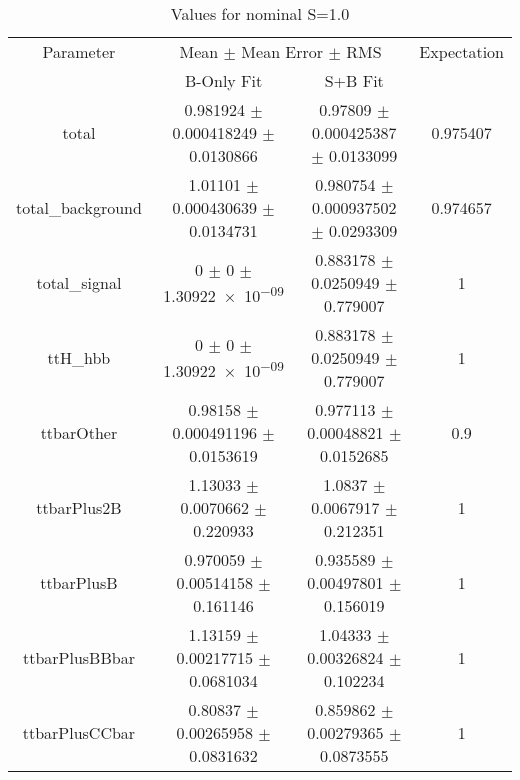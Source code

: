 \begin{table}
\centering
\caption{Values for nominal S=1.0}
\begin{tabular}{cccc}
\toprule
Parameter & \multicolumn{2}{c}{Mean $\pm$ Mean Error $\pm$ RMS} & Expectation\\
 & B-Only Fit & S+B Fit & \\
\midrule
total & \num{0.981924} $\pm$ \num{0.000418249} $\pm$ \num{0.0130866} & \num{0.97809} $\pm$ \num{0.000425387} $\pm$ \num{0.0133099} & \num{0.975407}\\
total\_background & \num{1.01101} $\pm$ \num{0.000430639} $\pm$ \num{0.0134731} & \num{0.980754} $\pm$ \num{0.000937502} $\pm$ \num{0.0293309} & \num{0.974657}\\
total\_signal & \num{0} $\pm$ \num{0} $\pm$ \num{1.30922e-09} & \num{0.883178} $\pm$ \num{0.0250949} $\pm$ \num{0.779007} & \num{1}\\
ttH\_hbb & \num{0} $\pm$ \num{0} $\pm$ \num{1.30922e-09} & \num{0.883178} $\pm$ \num{0.0250949} $\pm$ \num{0.779007} & \num{1}\\
ttbarOther & \num{0.98158} $\pm$ \num{0.000491196} $\pm$ \num{0.0153619} & \num{0.977113} $\pm$ \num{0.00048821} $\pm$ \num{0.0152685} & \num{0.9}\\
ttbarPlus2B & \num{1.13033} $\pm$ \num{0.0070662} $\pm$ \num{0.220933} & \num{1.0837} $\pm$ \num{0.0067917} $\pm$ \num{0.212351} & \num{1}\\
ttbarPlusB & \num{0.970059} $\pm$ \num{0.00514158} $\pm$ \num{0.161146} & \num{0.935589} $\pm$ \num{0.00497801} $\pm$ \num{0.156019} & \num{1}\\
ttbarPlusBBbar & \num{1.13159} $\pm$ \num{0.00217715} $\pm$ \num{0.0681034} & \num{1.04333} $\pm$ \num{0.00326824} $\pm$ \num{0.102234} & \num{1}\\
ttbarPlusCCbar & \num{0.80837} $\pm$ \num{0.00265958} $\pm$ \num{0.0831632} & \num{0.859862} $\pm$ \num{0.00279365} $\pm$ \num{0.0873555} & \num{1}\\
\bottomrule
\end{tabular}
\end{table}